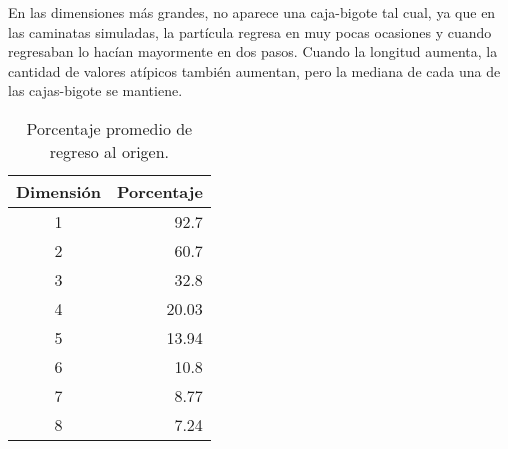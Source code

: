 \documentclass[12pt,letterpaper]{article}
\begin{document}
En las dimensiones más grandes, no aparece una caja-bigote tal cual, ya que en las caminatas simuladas, la partícula regresa en muy pocas ocasiones y cuando regresaban lo hacían mayormente en dos pasos. Cuando la longitud aumenta, la cantidad de valores atípicos también aumentan, pero la mediana de cada una de las cajas-bigote se mantiene. 


 
\begin{table}
\centering
\caption{Porcentaje promedio de regreso al origen.}
\begin{tabular}{cr}
  \hline
Dimensión & Porcentaje\\
\hline
1& 92.7\\
2&60.7\\
3&32.8\\
4&20.03\\
5&13.94\\
6&10.8\\
7&8.77\\
8&7.24\\
   \hline
\end{tabular}
\label{porcentajes-dim}
\end{table}
\end{document}
